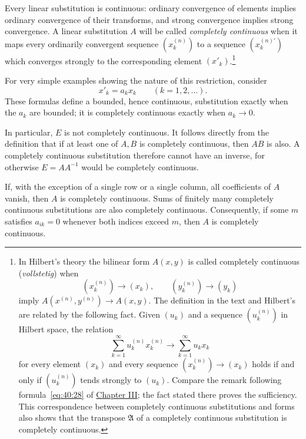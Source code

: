 \documentclass[
  paper=b5,
  fontsize=13pt,
  twoside=true,
  open=any,
  bookmarkpackage=false,
  chapterprefix=true,
  headings=normal
]{scrbook}
\theoremstyle{definition}
\begin{document}
Every linear substitution is continuous: ordinary convergence of elements
implies ordinary convergence of their transforms, and strong convergence
implies strong convergence. A linear substitution $A$ will be called
\emph{completely continuous} when it maps every ordinarily convergent
sequence $(x_k^{(n)})$ to a sequence $(x_k^{(n)\prime})$ which converges
strongly to the corresponding element $(x'_k)$.\footnote{In Hilbert's
theory the bilinear form $A(x,y)$ is called completely continuous
(\emph{vollstetig}) when
\[
 (x_k^{(n)})\to(x_k),\qquad(y_k^{(n)})\to(y_k)
\]
imply $A(x^{(n)},y^{(n)})\to A(x,y)$. The definition in the text and
Hilbert's are related by the following fact. Given $(u_k)$ and a sequence
$(u_k^{(n)})$ in Hilbert space, the relation
\[
 \sum_{k=1}^{\infty}u_k^{(n)}x_k^{(n)}
 \longrightarrow\sum_{k=1}^{\infty}u_kx_k
\]
for every element $(x_k)$ and every sequence $(x_k^{(n)})\to(x_k)$ holds
if and only if $(u_k^{(n)})$ tends strongly to $(u_k)$. Compare the remark
following formula~\eqref{eq:40:28} of \hyperref[chap:3]{Chapter III}; the fact stated there proves the
sufficiency. This correspondence between completely continuous
substitutions and forms also shows that the transpose $\mathfrak A$ of a
completely continuous substitution is completely continuous.}

For very simple examples showing the nature of this restriction, consider
\[
  x'_k=a_kx_k\qquad(k=1,2,\ldots).
\]
These formulas define a bounded, hence continuous, substitution exactly
when the $a_k$ are bounded; it is completely continuous exactly when
$a_k\to0$.

In particular, $E$ is not completely continuous. It follows directly from
the definition that if at least one of $A,B$ is completely continuous, then
$AB$ is also. A completely continuous substitution therefore cannot have
an inverse, for otherwise $E=AA^{-1}$ would be completely continuous.

If, with the exception of a single row or a single column, all coefficients
of $A$ vanish, then $A$ is completely continuous. Sums of finitely many
completely continuous substitutions are also completely continuous.
Consequently, if some $m$ satisfies $a_{ik}=0$ whenever both indices exceed
$m$, then $A$ is completely continuous.
\end{document}
